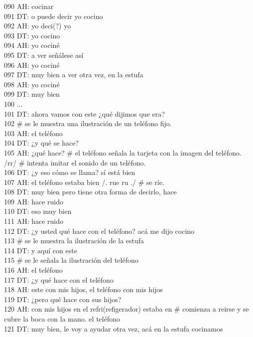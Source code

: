 090 AH: cocinar\\
091 DT: o puede decir yo cocino\\
092 AH: yo deci(?) yo\\
093 DT: yo cocino\\
094 AH: yo cociné\\
095 DT: a ver señálese así\\
096 AH: yo cociné\\
097 DT: muy bien a ver otra vez, en la estufa\\
098 AH: yo cociné \\
099 DT: muy bien\\
100 ...\\
101 DT: ahora vamos con este ¿qué dijimos que era?\\
102 \# se le muestra una ilustración de un teléfono fijo.\\
103 AH: el teléfono\\
104 DT: ¿y qué se hace?\\
105 AH: ¿qué hace? \# el teléfono señala la tarjeta con la imagen del teléfono. /rr/ \# intenta imitar el sonido de un teléfono.\\
106 DT: ¿y eso cómo se llama? sí está bien\\
107 AH: el teléfono estaba bien /. rue ru ./ # se ríe.\\
108 DT: muy bien pero tiene otra forma de decirlo, hace\\
109 AH: hace ruido\\
110 DT: eso muy bien\\
111 AH: hace ruido \\
112 DT: ¿y usted qué hace con el teléfono? acá me dijo cocino\\
113 \# se le muestra la ilustración de la estufa\\
114 DT: y aquí con este\\
115 \# se le señala la ilustración del teléfono\\
116 AH: el teléfono\\
117 DT: ¿y qué hace con el teléfono\\
118 AH: este con mis hijos, el teléfono con mis hijos\\
119 DT: ¿pero qué hace con sus hijos?\\
120 AH: con mis hijos en el refri(refigerador) estaba en \# comienza a reirse y se cubre la boca con la mano. el teléfono\\
121 DT: muy bien, le voy a ayudar otra vez, acá en la estufa cocinamos\\
